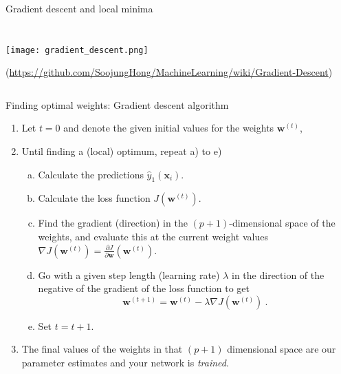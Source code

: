 \documentclass[10pt,ignorenonframetext,]{beamer}
\providecommand{\tightlist}{%
  \setlength{\itemsep}{0pt}\setlength{\parskip}{0pt}}
\begin{document}
\begin{frame}

\begin{block}{Gradient descent and local minima}

\(~\)

\(~\)

\center

\texttt{[image: gradient\_descent.png]}

\tiny (\url{https://github.com/SoojungHong/MachineLearning/wiki/Gradient-Descent})

\(~\)

\end{block}

\end{frame}

\begin{frame}

\begin{block}{Finding optimal weights: Gradient descent algorithm}

\vspace{2mm}

\begin{enumerate}
\tightlist
\item
  Let \(t=0\) and denote the given initial values for the weights
  \({\boldsymbol w}^{(t)}\), \vspace{2mm}
\item
  Until finding a (local) optimum, repeat a) to e)

  \begin{enumerate}
  [a)]
  \tightlist
  \item
    Calculate the predictions \({\hat{y}_1({\boldsymbol x}_i)}\).
  \item
    Calculate the loss function \(J({\boldsymbol w}^{(t)})\).
  \item
    Find the gradient (direction) in the \((p+1)\)-dimensional space of
    the weights, and evaluate this at the current weight values
    \(\nabla J({\boldsymbol w}^{(t)})={\frac{\partial J}{\partial {\boldsymbol w}}}({\boldsymbol w}^{(t)})\).
  \item
    Go with a given step length (learning rate) \(\lambda\) in the
    direction of the negative of the gradient of the loss function to
    get
    \[{\boldsymbol w}^{(t+1)}={\boldsymbol w}^{(t)} - \lambda \nabla J({\boldsymbol w}^{(t)}) \ .\]
  \item
    Set \(t=t+1\). \vspace{2mm}
  \end{enumerate}
\item
  The final values of the weights in that \((p+1)\) dimensional space
  are our parameter estimates and your network is \emph{trained}.
\end{enumerate}

\end{block}

\end{frame}
\end{document}
